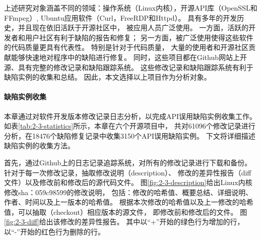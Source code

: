 上述研究对象涵盖不同的领域：操作系统（Linux内核），开源API库（OpenSSL和FFmpeg）,
Ubuntu应用软件（Curl，FreeRDP和Httpd）。
具有多年的开发历史，并且现在依旧活跃于开源社区中，
被应用人员广泛使用。
一方面，活跃的开发者和用户社区有利于缺陷的报告和修复；
另一方面，被广泛使用使得这些软件的代码质量更具有代表性。
特别是针对于代码质量，
大量的使用者和开源社区贡献能够快速地对程序中的缺陷进行修复。
同时，这些项目都在Github网站上开源、具有完整的修改记录和缺陷跟踪系统。
这些修改记录和缺陷跟踪系统有利于缺陷实例的收集和总结。
因此，本文选择以上项目作为分析对象。

\paragraph{缺陷实例收集}



本章通过对软件开发版本修改记录日志分析，以完成API误用缺陷实例收集工作。
如表\ref{tab:2-3-statistics}所示，本章在六个开源项目中，
共对61096个修改记录进行分析，在18476个缺陷修复记录中收集3150个API误用缺陷实例。
下文将详细描述缺陷实例的收集方法。

首先，通过Github上的日志记录追踪系统，对所有的修改记录进行下载和备份。
针对于每一次修改记录，抽取修改说明（description）、
修改的差异性报告（diff文件）以及修改前和修改后的源代码文件。
图\ref{fig:2-3-description}给出Linux内核修改sha：059c98599的修改说明，
包括：修改的哈希值、概要总结、详细说明、作者、时间以及上一版本的哈希值。
根据本次修改的哈希值以及上一修改的哈希值，可以抽取（checkout）相应版本的源文件，
即修改前和修改后的文件。
图\ref{fig:2-3-diff}给出该修改的差异性报告。
其中以“+”开始的绿色行为增加的行，以“-”开始的红色行为删除的行。




